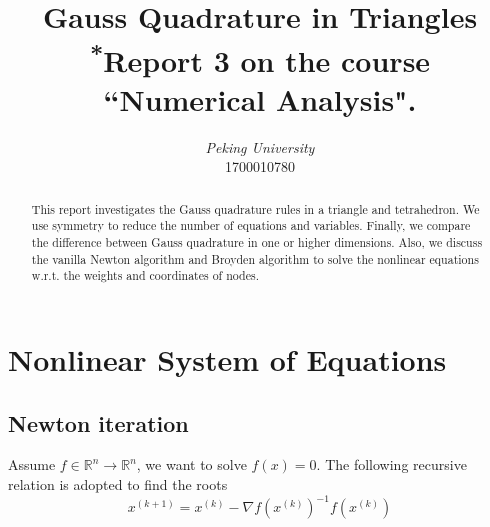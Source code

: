 \documentclass[conference,onecolumn, 12pt]{IEEEtran}
\begin{document}
\title{Gauss Quadrature in Triangles\\
{\footnotesize \textsuperscript{*}Report 3 on the course ``Numerical Analysis".}
}

\author{
\textit{Peking University}\\
1700010780\\
}

\maketitle
\thispagestyle{fancy} %
\lhead{} %
\chead{} %
\rhead{} %
\lfoot{} %
\cfoot{} %
\cfoot{\thepage} %
\renewcommand{\headrulewidth}{0pt} %
\renewcommand{\footrulewidth}{1pt} %
\pagestyle{fancy}
\cfoot{\thepage}

\begin{abstract}
    This report investigates the Gauss quadrature rules in a triangle and tetrahedron. We use symmetry to reduce the number of equations and variables. Finally, we compare the difference between Gauss quadrature in one or higher dimensions. Also, we discuss the vanilla Newton algorithm and Broyden algorithm to solve the nonlinear equations w.r.t. the weights and coordinates of nodes.
\end{abstract}

\tableofcontents
\clearpage
\section{Nonlinear System of Equations}

\subsection{Newton iteration}
Assume $f\in \mathbb{R}^n\to \mathbb{R}^n$, we want to solve $f(x)=0$. The following recursive relation is adopted to find the roots
\begin{equation}
    x^{(k+1)}=x^{(k)}-\nabla f(x^{(k)})^{-1}f(x^{(k)})
\end{equation}
\end{document}
